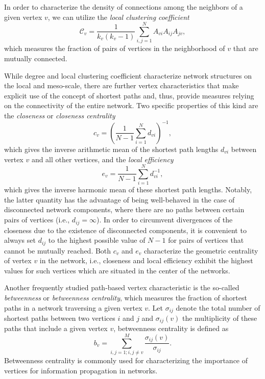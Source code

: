 		In order to characterize the density of connections among the neighbors of a given vertex $v$, we can utilize the \textit{local clustering coefficient}
\begin{equation}
  {\mathcal{C}}_v =\frac{1}{  {k}_v (  {k}_v -1)} \sum_{i,j=1}^N A_{vi}  A_{ij}  A_{jv} ,
\label{eq:locclustering}
\end{equation}
\noindent
which measures the fraction of pairs of vertices in the neighborhood of $v$ that are mutually connected. 

		While degree and local clustering coefficient characterize network structures on the local and meso-scale, there are further vertex characteristics that make explicit use of the concept of shortest paths and, thus, provide measures relying on the connectivity of the entire network. Two specific properties of this kind are the \textit{closeness} or \textit{closeness centrality}
\begin{equation}
  {c}_v =\left(\frac{1}{N-1}\sum_{i=1}^N   {d}_{vi}  \right)^{-1},
\label{eq:closeness}
\end{equation}
\noindent
which gives the inverse arithmetic mean of the shortest path lengths $d_{vi}$ between vertex $v$ and all other vertices, and the \textit{local efficiency}
\begin{equation}
  {e}_v =\frac{1}{N-1}\sum_{i=1}^N   {d}_{vi} ^{-1},
\label{eq:locefficiency}
\end{equation}
\noindent
which gives the inverse harmonic mean of these shortest path lengths. Notably, the latter quantity has the advantage of being well-behaved in the case of disconnected network components, where there are no paths between certain pairs of vertices (i.e., $  {d}_{ij}=\infty$). In order to circumvent divergences of the closeness due to the existence of disconnected components, it is convenient to always set ${d}_{ij}$ to the highest possible value of $N-1$ for pairs of vertices that cannot be mutually reached. Both $  {c}_v $ and $  {e}_v $ characterize the geometric centrality of vertex $v$ in the network, i.e., closeness and local efficiency exhibit the highest values for such vertices which are situated in the center of the networks. 

		Another frequently studied path-based vertex characteristic is the so-called \textit{betweenness} or \textit{betweenness centrality}, which measures the fraction of shortest paths in a network traversing a given vertex $v$. Let $  {\sigma}_{ij}$ denote the total number of shortest paths between two vertices $i$ and $j$ and $  {\sigma}_{ij}(v)$ the multiplicity of these paths that include a given vertex $v$, betweenness centrality is defined as
\begin{equation}
  {b}_v =\sum_{i,j=1; i,j\neq v}^M \frac{  {\sigma}_{ij}(v)}{  {\sigma}_{ij}}.
\label{eq:betweenness}
\end{equation}
\noindent
Betweenness centrality is commonly used for characterizing the importance of vertices for information propagation in networks. 

